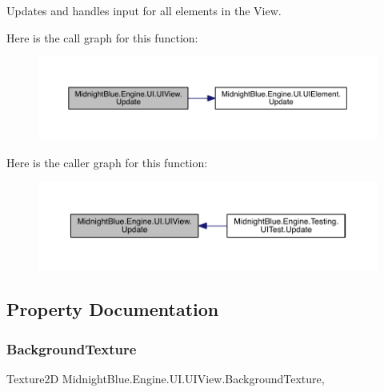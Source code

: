 Updates and handles input for all elements in the View. 

Here is the call graph for this function\+:
\nopagebreak
\begin{figure}[H]
\begin{center}
\leavevmode
\includegraphics[width=350pt]{class_midnight_blue_1_1_engine_1_1_u_i_1_1_u_i_view_aba1d6f02ef75ed1a595f448acef47915_cgraph}
\end{center}
\end{figure}
Here is the caller graph for this function\+:
\nopagebreak
\begin{figure}[H]
\begin{center}
\leavevmode
\includegraphics[width=350pt]{class_midnight_blue_1_1_engine_1_1_u_i_1_1_u_i_view_aba1d6f02ef75ed1a595f448acef47915_icgraph}
\end{center}
\end{figure}


\subsection{Property Documentation}
\hypertarget{class_midnight_blue_1_1_engine_1_1_u_i_1_1_u_i_view_ab4edda3ba89c275a7ba619eba97fc244}{}\label{class_midnight_blue_1_1_engine_1_1_u_i_1_1_u_i_view_ab4edda3ba89c275a7ba619eba97fc244} 
\subsubsection{\texorpdfstring{Background\+Texture}{BackgroundTexture}}
{\footnotesize\ttfamily Texture2D Midnight\+Blue.\+Engine.\+U\+I.\+U\+I\+View.\+Background\+Texture\hspace{0.3cm}{\ttfamily [get]}, {\ttfamily [set]}}



